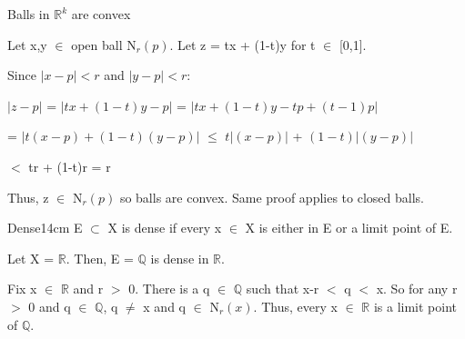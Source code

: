 	\begin{example}
		Balls in $\mathbb{R}^k$ are convex
	\end{example}

	\begin{tbox}
		Let x,y $\in$ open ball N$_r(p)$. Let z = tx + (1-t)y for t $\in$ [0,1].
		
		Since $|x - p| < r$ and $|y - p| < r$:

		\hspace{1cm}
		$|z - p|$ = $|tx + (1-t)y - p|$
		= $|tx + (1-t)y - tp + (t-1)p|$

		\hspace{2.3cm}
		= $|t(x-p) + (1-t)(y-p)|$ $\leq$ $t|(x-p)|$ + $(1-t)|(y-p)|$

		\hspace{2.3cm}
		$<$ tr + (1-t)r = r

		Thus, z $\in$ N$_r(p)$ so balls are convex.
		Same proof applies to closed balls.	
	\end{tbox}

	\vspace{0.5cm}



	\begin{definition}{Dense}{14cm}
		E $\subset$ X is dense if every x $\in$ X is either in E or
		a limit point of E.
	\end{definition}
	
	\vspace{0.5cm}



	\begin{example}
		Let X = $\mathbb{R}$. Then, E = $\mathbb{Q}$ is dense in $\mathbb{R}$.
	\end{example}

	\begin{tbox}
		Fix x $\in$ $\mathbb{R}$ and r $>$ 0.
		There is a q $\in$ $\mathbb{Q}$ such that x-r $<$ q $<$ x.
		So for any r $>$ 0 and q $\in$ $\mathbb{Q}$, q $\neq$ x and
		q $\in$ N$_r(x)$.
		Thus, every x $\in$ $\mathbb{R}$ is a limit point of $\mathbb{Q}$.
	\end{tbox}
	 



